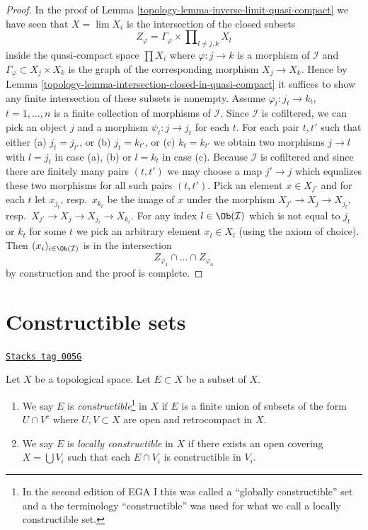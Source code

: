 \begin{proof}

In the proof of Lemma \ref{topology-lemma-inverse-limit-quasi-compact}
we have seen that $X = \lim X_i$ is the intersection of the
closed subsets
$$
Z_\varphi = \Gamma_\varphi \times \prod\nolimits_{l \not = j, k} X_l
$$
inside the quasi-compact space $\prod X_i$ where $\varphi : j \to k$
is a morphism of $\mathcal{I}$ and $\Gamma_\varphi \subset X_j \times X_k$
is the graph of the corresponding morphism $X_j \to X_k$. Hence by
Lemma \ref{topology-lemma-intersection-closed-in-quasi-compact}
it suffices to show any finite intersection of these subsets is nonempty.
Assume $\varphi_t : j_t \to k_t$, $t = 1, \ldots, n$ is a finite collection
of morphisms of $\mathcal{I}$. Since $\mathcal{I}$ is cofiltered, we can
pick an object $j$ and a morphism $\psi_t : j \to j_t$ for each $t$.
For each pair $t, t'$ such that either (a) $j_t = j_{t'}$, or
(b) $j_t = k_{t'}$, or (c) $k_t = k_{t'}$ we obtain two morphisms
$j \to l$ with $l = j_t$ in case (a), (b) or $l = k_t$ in case (c).
Because $\mathcal{I}$ is cofiltered and since there are finitely
many pairs $(t, t')$ we may choose a map $j' \to j$ which equalizes
these two morphisms for all such pairs $(t, t')$. Pick an element
$x \in X_{j'}$ and for each $t$ let $x_{j_t}$, resp.\ $x_{k_t}$
be the image of $x$ under the morphism $X_{j'} \to X_j \to X_{j_t}$,
resp.\ $X_{j'} \to X_j \to X_{j_t} \to X_{k_t}$.
For any index $l \in \Ob(\mathcal{I})$ which is not equal to
$j_t$ or $k_t$ for some $t$ we pick an arbitrary element $x_l \in X_l$
(using the axiom of choice). Then $(x_i)_{i \in \Ob(\mathcal{I})}$
is in the intersection
$$
Z_{\varphi_1} \cap \ldots \cap Z_{\varphi_n}
$$
by construction and the proof is complete.
\end{proof}

\section{Constructible sets}
\label{topology-section-constructible}
\begin{definition}[Constructible]
\label{topology-definition-constructible}
\href{https://stacks.math.columbia.edu/tag/005G}{\texttt{Stacks tag 005G}}

Let $X$ be a topological space. Let $E \subset X$ be a subset of $X$.
\begin{enumerate}
\item We say $E$ is {\it constructible}\footnote{In the second edition
of EGA I \cite{EGA1-second} this was called a ``globally constructible''
set and a the terminology ``constructible'' was used for what we call a locally
constructible set.}
in $X$ if $E$ is a finite union
of subsets of the form $U \cap V^c$ where $U, V \subset X$ are open and
retrocompact in $X$.
\item We say $E$ is {\it locally constructible} in $X$ if there exists an open
covering $X = \bigcup V_i$ such that each $E \cap V_i$ is constructible
in $V_i$.
\end{enumerate}
\end{definition}

